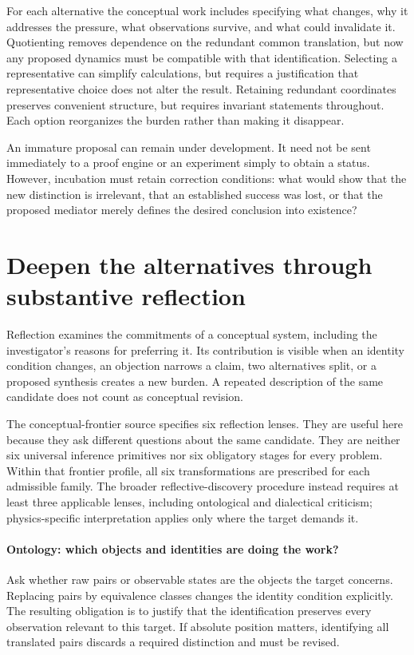 For each alternative the conceptual work includes specifying what changes, why it
addresses the pressure, what observations survive, and what could invalidate it.
Quotienting removes dependence on the redundant common translation, but now any
proposed dynamics must be compatible with that identification. Selecting a
representative can simplify calculations, but requires a justification that
representative choice does not alter the result. Retaining redundant coordinates
preserves convenient structure, but requires invariant statements throughout.
Each option reorganizes the burden rather than making it disappear.

An immature proposal can remain under development. It need not be sent immediately
to a proof engine or an experiment simply to obtain a status. However, incubation
must retain correction conditions: what would show that the new distinction is
irrelevant, that an established success was lost, or that the proposed mediator
merely defines the desired conclusion into existence?

\section{Deepen the alternatives through substantive reflection}
\label{sec:conceptual-reflection}
Reflection examines the commitments of a conceptual system, including the
investigator's reasons for preferring it. Its contribution is visible when an
identity condition changes, an objection narrows a claim, two alternatives split,
or a proposed synthesis creates a new burden. A repeated description of the same
candidate does not count as conceptual revision.

The conceptual-frontier source specifies six reflection lenses. They are useful
here because they ask different questions about the same candidate. They are
neither six universal inference primitives nor six obligatory stages for every
problem. Within that frontier profile, all six transformations are prescribed for
each admissible family. The broader reflective-discovery procedure instead requires
at least three applicable lenses, including ontological and dialectical criticism;
physics-specific interpretation
applies only where the target demands it.

\paragraph{Ontology: which objects and identities are doing the work?}
Ask whether raw pairs or observable states are the objects the target concerns.
Replacing pairs by equivalence classes changes the identity condition explicitly.
The resulting obligation is to justify that the identification preserves every
observation relevant to this target. If absolute position matters, identifying all
translated pairs discards a required distinction and must be revised.

